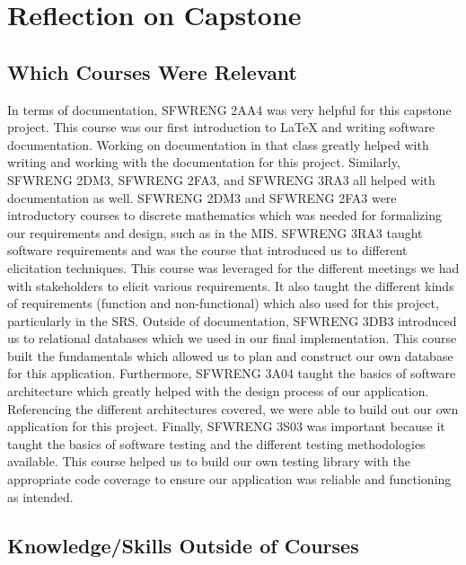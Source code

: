 \documentclass{article}
\begin{document}
\section{Reflection on Capstone}


\subsection{Which Courses Were Relevant}


In terms of documentation, SFWRENG 2AA4 was very helpful for this capstone project. This course was our first
introduction to \LaTeX{} and writing software documentation. Working on documentation in that class greatly helped
with writing and working with the documentation for this project. Similarly, SFWRENG 2DM3, SFWRENG 2FA3, and SFWRENG 3RA3
all helped with documentation as well. SFWRENG 2DM3 and SFWRENG 2FA3 were introductory courses to discrete mathematics
which was needed for formalizing our requirements and design, such as in the MIS. SFWRENG 3RA3 taught software requirements and was the course
that introduced us to different elicitation techniques. This course was leveraged for the different meetings we had with stakeholders to elicit
various requirements. It also taught the different kinds of requirements (function and non-functional) which also used for this project, particularly
in the SRS. Outside of documentation, SFWRENG 3DB3 introduced us to relational databases which we used in our final
implementation. This course built the fundamentals which allowed us to plan and construct our own database for this application.
Furthermore, SFWRENG 3A04 taught the basics of software architecture which greatly helped with the design process of our
application. Referencing the different architectures covered, we were able to build out our own application for this project. Finally,
SFWRENG 3S03 was important because it taught the basics of software testing and the different testing methodologies available. This
course helped us to build our own testing library with the appropriate code coverage to ensure our application was reliable
and functioning as intended.

\subsection{Knowledge/Skills Outside of Courses}
\end{document}
